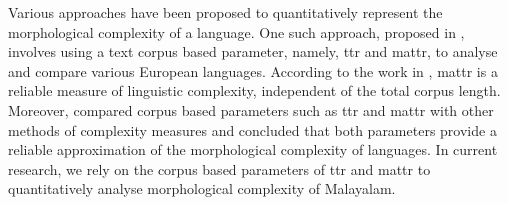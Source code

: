 




Various approaches have been proposed to quantitatively represent the morphological complexity of a language. One such approach, proposed in \cite{kettunen2014can}, involves using a text corpus based parameter, namely, \gls{ttr} and \gls{mattr}, to analyse and compare various European languages. According to the work in  \cite{covington2010cutting}, \gls{mattr} is a reliable measure of linguistic complexity, independent of the total corpus length. Moreover, \cite{kettunen2014can} compared corpus based parameters such as \gls{ttr} and \gls{mattr} with other methods of complexity measures and concluded that both parameters provide a reliable approximation of the morphological complexity of languages. In current research, we rely on the corpus based parameters of \gls{ttr} and \gls{mattr} to quantitatively analyse morphological complexity of Malayalam.


